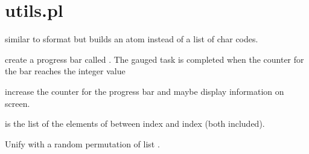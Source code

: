 


\section{utils.pl}

\label{sec:utils}

\begin{description}
similar to sformat but builds an atom instead of a list of char codes.

create a progress bar called . The gauged task is completed
when the counter for the bar reaches the integer value 

increase the counter for the progress bar  and maybe display
information on screen.

 is the list of the elements of  between index  and index 
(both included).

Unify  with a random permutation of list .
\end{description}

